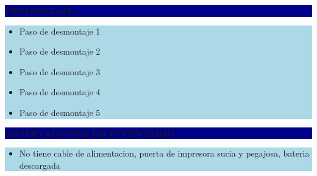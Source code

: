 \documentclass[11pt]{article}
\newcommand{\seccionbanda}[1]{%
  \vspace{0.6em}
  \noindent\colorbox{darkblue}{\parbox{\dimexpr\linewidth-2\fboxsep}{%
    \centering\color{white}\bfseries #1}}\par\vspace{0.6em}
}
\begin{document}
\seccionbanda{DESMONTAJE}
\noindent\colorbox{lightblue}{\parbox{\dimexpr\linewidth-2\fboxsep\relax}{%
\begin{itemize}[label=$\square$, itemsep=4pt]
\item Paso de desmontaje 1
\item Paso de desmontaje 2
\item Paso de desmontaje 3
\item Paso de desmontaje 4
\item Paso de desmontaje 5
\end{itemize}
}}\par
\seccionbanda{OBSERVACIONES EN INVENTARIO}
\noindent\colorbox{lightblue}{\parbox{\dimexpr\linewidth-2\fboxsep\relax}{\begin{itemize}[itemsep=4pt]
\item No tiene cable de alimentacion, puerta de impresora sucia y pegajosa, bateria descargada
\end{itemize}}}\par
\end{document}
